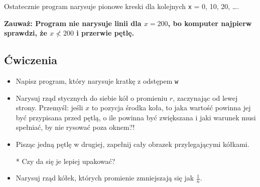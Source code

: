 \documentclass{instrukcja}
\begin{document}
Ostatecznie program narysuje pionowe kreski dla kolejnych {\tt x} = 0, 10, 20, \ldots.

{\bf {\red Zauważ:} Program nie narysuje linii dla $x=200$, bo komputer najpierw sprawdzi, że $x\not< 200$ i przerwie pętlę.}


\subsection*{Ćwiczenia}
\begin{itemize}
\item Napisz program, który narysuje kratkę z odstępem {\tt w}
\item Narysuj rząd stycznych do siebie kół o promieniu $r$, zaczynając od lewej strony. Przemyśl: jeśli $x$ to pozycja środka koła, to jaka wartość powinna jej być przypisana przed pętlą, o ile powinna być zwiększana i jaki warunek musi spełniać, by nie rysować poza oknem?!
\item Pisząc jedną pętlę w drugiej, zapełnij cały obrazek przylegającymi kółkami.
\item[*] Czy da się je lepiej upakować?
\item Narysuj rząd kółek, których promienie zmniejszają się jak $\frac{1}{n}$.
\end{itemize}
\end{document}
